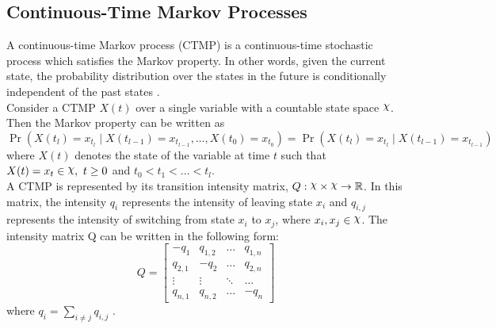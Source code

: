 \subsection{Continuous-Time Markov Processes}
A continuous-time Markov process (CTMP) is a continuous-time stochastic process which satisfies the Markov property. In other words, given the current state, the probability distribution over the states in the future is conditionally independent of the past states \cite{Cohn2010a}. \\
Consider a CTMP $ X(t) $ over a single variable with a countable state space $ \rchi $. Then the Markov property can be written as
\begin{equation}
\operatorname{Pr}\left(X(t_{l})=x_{t_{l}} \mid X(t_{l-1})=x_{t_{l-1}}, \ldots, X(t_{0})=x_{t_{0}}\right)=\operatorname{Pr}\left(X(t_{l})=x_{t_{l}} \mid X(t_{l-1})=x_{t_{l-1}}\right)
\end{equation}
where $ X(t) $ denotes the state of the variable at time $ t $ such that $ X(t)=x_t \in \rchi,\ t \geq 0$ and $ t_0<t_1<...<t_l $.\\
A CTMP is represented by its transition intensity matrix, $ Q : \rchi \times \rchi \rightarrow \mathbb{R}$. In this matrix, the intensity $ q_{i} $ represents the intensity of leaving state $ x_{i} $ and $ q_{i,j} $ represents the intensity of switching from state $ x_{i} $ to $ x_{j} $, where $ x_i, x_j \in \rchi $. The intensity matrix Q can be written in the following form:
\begin{equation}
Q = 
\begin{bmatrix}
-q_{1} & q_{1,2} &     {\hdots}  & q_{1,n} \\
q_{2,1} & -q_{2} &     {\hdots}  & q_{2,n}  \\
{\vdots}  &     {\vdots}  &     {\ddots}  & {\hdots}  \\
q_{n,1} &  q_{n,2} &  {\hdots} & -q_{n}
\end{bmatrix}
\label{eq:Q_matrix}
\end{equation}
where $ q_{i} = \sum_{i \neq j} q_{i,j}$ \cite{Nodelman1995}.

